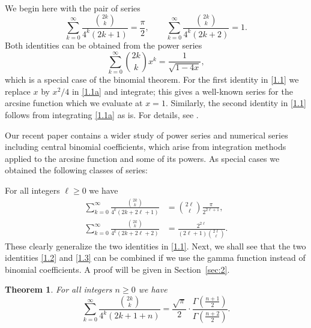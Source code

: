 \documentclass{amsart}
\newtheorem{theorem}{Theorem}[section]
\theoremstyle{definition}
\theoremstyle{remark}
\numberwithin{equation}{section}
\begin{document}
We begin here with the pair of series
\begin{equation}\label{1.1}
\sum_{k=0}^\infty\frac{\binom{2k}{k}}{4^k(2k+1)}=\frac{\pi}{2},\qquad
\sum_{k=0}^\infty\frac{\binom{2k}{k}}{4^k(2k+2)}=1.
\end{equation}
Both identities can be obtained from the power series
\begin{equation}\label{1.1a}
\sum_{k=0}^\infty\binom{2k}{k}x^k = \frac{1}{\sqrt{1-4x}},
\end{equation}
which is a special case of the binomial theorem. For the first identity in
\eqref{1.1} we replace $x$ by $x^2/4$ in \eqref{1.1a} and integrate; this 
gives a well-known series for the arcsine function which we evaluate at $x=1$.
Similarly, the second identity in \eqref{1.1} follows from integrating
\eqref{1.1a} as is. For details, see \cite[p.~449--451]{Le}.

Our recent paper \cite{DV} contains a wider study of power series and
numerical series including central binomial coefficients, which arise from 
integration methods applied to the arcsine function and some of its powers. 
As special cases we obtained the following classes of series:

For all integers $\ell\geq 0$ we have
\begin{align}
\sum_{k=0}^\infty\frac{\binom{2k}{k}}{4^k(2k+2\ell+1)}
&=\binom{2\ell}{\ell}\frac{\pi}{2^{2\ell+1}},\label{1.2} \\
\sum_{k=0}^\infty\frac{\binom{2k}{k}}{4^k(2k+2\ell+2)}
&= \frac{2^{2\ell}}{(2\ell+1)\binom{2\ell}{\ell}}.\label{1.3}
\end{align}
These clearly generalize the two identities in \eqref{1.1}. Next, we shall see
that the two identities \eqref{1.2} and \eqref{1.3} can be combined if we use
the gamma function instead of binomial coefficients. A proof will be given in
Section~\ref{sec:2}.

\begin{theorem}\label{thm:1.1}
For all integers $n\geq 0$ we have
\begin{equation}\label{1.4}
\sum_{k=0}^\infty\frac{\binom{2k}{k}}{4^k(2k+1+n)}
=\frac{\sqrt{\pi}}{2}\cdot\frac{\Gamma(\frac{n+1}{2})}{\Gamma(\frac{n+2}{2})}.
\end{equation}
\end{theorem}
\end{document}
